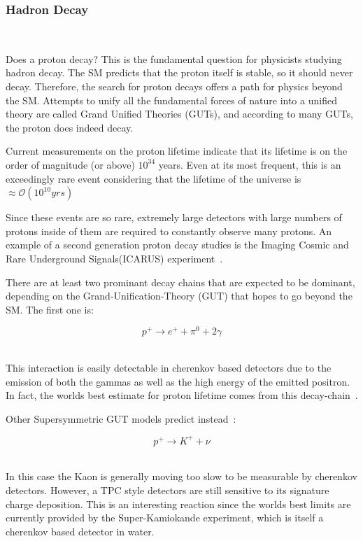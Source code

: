\subsubsection{Hadron Decay}~\label{sec:hadron_decay}

Does a proton decay?
This is the fundamental question for physicists studying hadron decay.
The SM predicts that the proton itself is stable, so it should never decay.
Therefore, the search for proton decays offers a path for physics beyond the SM.
Attempts to unify all the fundamental forces of nature into a unified theory are called Grand Unified Theories (GUTs), and according to many GUTs, the proton does indeed decay.

Current measurements on the proton lifetime indicate that its lifetime is on the order of magnitude (or above) $10^{34}$ years.
Even at its most frequent, this is an exceedingly rare event considering that the lifetime of the universe is $\approx \mathcal{O}(10^{10} yrs)$

Since these events are so rare, extremely large detectors with large numbers of protons inside of them are required to constantly observe many protons.
An example of a second generation proton decay studies is the Imaging Cosmic and Rare Underground Signals(ICARUS) experiment~\citep{ICARUS_2001}.

There are at least two prominant decay chains that are expected to be dominant, depending on the Grand-Unification-Theory (GUT) that hopes to go beyond the SM.
The first one is:

\begin{equation}
  p^{+} \rightarrow e^{+} + \pi^{0} + 2 \gamma
\end{equation}
~\label{eq:rxn_proton_decay1}

This interaction is easily detectable in cherenkov based detectors due to the emission of both the gammas as well as the high energy of the emitted positron.
In fact, the worlds best estimate for proton lifetime comes from this decay-chain~\citep{PhysRevD.95.012004}.

Other Supersymmetric GUT models predict instead~\citep{PhysRevD.38.1479}:

\begin{equation}
  p^{+} \rightarrow K^{+} + \nu
\end{equation}
~\label{eq:rxn_proton_decay2}

In this case the Kaon is generally moving too slow to be measurable by cherenkov detectors.
However, a TPC style detectors are still sensitive to its signature charge deposition.
This is an interesting reaction since the worlds best limits are currently provided by the Super-Kamiokande experiment, which is itself a cherenkov based detector in water.

